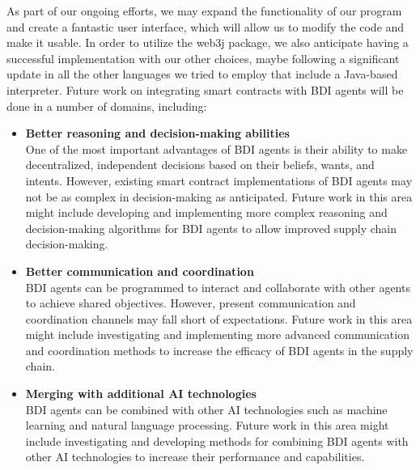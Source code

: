 \vspace{.5cm}

As part of our ongoing efforts, we may expand the functionality of our program and create a fantastic user interface, which will allow us to modify the code and make it usable. In order to utilize the web3j package, we also anticipate having a successful implementation with our other choices, maybe following a significant update in all the other languages we tried to employ that include a Java-based interpreter. Future work on integrating smart contracts with \ac{BDI} agents will be done in a number of domains, including:

\begin{itemize}
    \item \textbf{Better reasoning and decision-making abilities} \\ 
    One of the most important advantages of \ac{BDI} agents is their ability to make decentralized, independent decisions based on their beliefs, wants, and intents. However, existing smart contract implementations of \ac{BDI} agents may not be as complex in decision-making as anticipated. Future work in this area might include developing and implementing more complex reasoning and decision-making algorithms for \ac{BDI} agents to allow improved supply chain decision-making.

    \vspace{.5cm}
    
    \item \textbf{Better communication and coordination} \\ 
    \ac{BDI} agents can be programmed to interact and collaborate with other agents to achieve shared objectives. However, present communication and coordination channels may fall short of expectations. Future work in this area might include investigating and implementing more advanced communication and coordination methods to increase the efficacy of \ac{BDI} agents in the supply chain.

    \vspace{.5cm}
    
    \item \textbf{Merging with additional \ac{AI} technologies}\\ 
    \ac{BDI} agents can be combined with other \ac{AI} technologies such as machine learning and natural language processing. Future work in this area might include investigating and developing methods for combining \ac{BDI} agents with other \ac{AI} technologies to increase their performance and capabilities.


\end{itemize}
